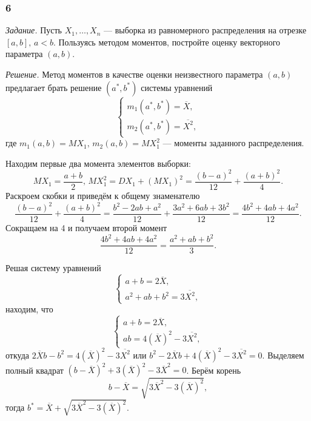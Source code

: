 \subsubsection*{6}

\textit{Задание.}
Пусть $X_1, \dotsc, X_n$ ---
выборка из равномерного распределения на отрезке $ \left[ a, b \right], \, a < b$.
Пользуясь методом моментов, постройте оценку векторного параметра $ \left( a, b \right) $.

\textit{Решение.}
Метод моментов в качестве оценки неизвестного параметра $ \left( a, b \right) $
предлагает брать решение $ \left( a^*, b^* \right) $ системы уравнений
$$ \begin{cases}
    m_1 \left( a^*, b^* \right) = \overline{X}, \\
    m_2 \left( a^*, b^* \right) = \overline{X^2},
  \end{cases}$$
где $m_1 \left( a, b \right) = MX_1, \, m_2 \left( a, b \right) = MX_1^2$ ---
моменты заданного распределения.

Находим первые два момента элементов выборки:
$$MX_1 = \frac{a + b}{2}, \,
  MX_1^2 =
  DX_1 + \left( MX_1 \right)^2 =
  \frac{ \left( b - a \right)^2}{12} + \frac{ \left( a + b \right)^2}{4}.$$
Раскроем скобки и приведём к общему знаменателю
$$ \frac{ \left( b - a \right)^2}{12} + \frac{ \left( a + b \right)^2}{4} =
  \frac{b^2 - 2ab + a^2}{12} + \frac{3a^2 + 6ab + 3b^2}{12} =
  \frac{4b^2 + 4ab + 4a^2}{12}.$$
Сокращаем на 4 и получаем второй момент
$$ \frac{4b^2 + 4ab + 4a^2}{12} =
  \frac{a^2 + ab + b^2}{3}.$$

Решая систему уравнений
$$ \begin{cases}
    a + b = 2 \overline{X}, \\
    a^2 + ab + b^2 = 3 \overline{X^2},
  \end{cases}$$
находим, что
$$ \begin{cases}
    a + b = 2 \overline{X}, \\
    ab = 4 \left( \overline{X} \right)^2 - 3 \overline{X^2},
  \end{cases}$$
откуда $2 \overline{X} b - b^2 = 4 \left( \overline{X} \right)^2 - 3 \overline{X^2}$ или
$b^2 - 2 \overline{X} b + 4 \left( \overline{X} \right)^2 - 3 \overline{X^2} = 0$.
Выделяем полный квадрат
$ \left( b - \overline{X} \right)^2 + 3 \left( \overline{X} \right)^2 - 3 \overline{X}^2 =
  0$.
Берём корень
$$b - \overline{X} =
  \sqrt{3 \overline{X}^2 - 3 \left( \overline{X} \right)^2},$$
тогда $b^* = \overline{X} + \sqrt{3 \overline{X}^2 - 3 \left( \overline{X} \right)^2}$.

